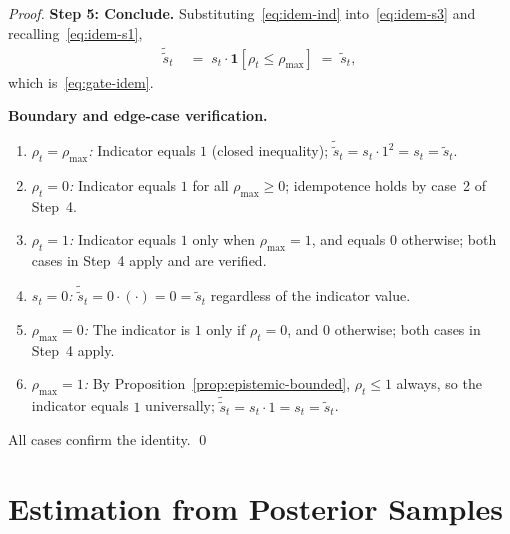 \documentclass[12pt,openany]{book}
\numberwithin{equation}{chapter}
\theoremstyle{plain}
\theoremstyle{definition}
\theoremstyle{remark}
\numberwithin{equation}{chapter}
\theoremstyle{plain}
\begin{document}
\begin{proof}
\medskip
\noindent\textbf{Step 5: Conclude.}
Substituting~\eqref{eq:idem-ind} into~\eqref{eq:idem-s3} and
recalling~\eqref{eq:idem-s1},
\begin{align}
  \tilde{\tilde{s}}_t
  &\;=\; s_t \cdot \mathbf{1}[\rho_t \leq \rho_{\max}]
  \;=\; \tilde{s}_t,
  \label{eq:idem-final}
\end{align}
which is~\eqref{eq:gate-idem}.

\medskip
\noindent\textbf{Boundary and edge-case verification.}
\begin{enumerate}
  \item \emph{$\rho_t = \rho_{\max}$:}
        Indicator equals $1$ (closed inequality);
        $\tilde{\tilde{s}}_t = s_t \cdot 1^{2} = s_t = \tilde{s}_t$.
  \item \emph{$\rho_t = 0$:}
        Indicator equals $1$ for all $\rho_{\max} \geq 0$;
        idempotence holds by case~2 of Step~4.
  \item \emph{$\rho_t = 1$:}
        Indicator equals $1$ only when $\rho_{\max} = 1$, and
        equals $0$ otherwise; both cases in Step~4 apply
        and are verified.
  \item \emph{$s_t = 0$:}
        $\tilde{\tilde{s}}_t = 0 \cdot (\cdot) = 0 = \tilde{s}_t$
        regardless of the indicator value.
  \item \emph{$\rho_{\max} = 0$:}
        The indicator is $1$ only if $\rho_t = 0$, and $0$
        otherwise; both cases in Step~4 apply.
  \item \emph{$\rho_{\max} = 1$:}
        By Proposition~\ref{prop:epistemic-bounded}, $\rho_t \leq 1$
        always, so the indicator equals $1$ universally;
        $\tilde{\tilde{s}}_t = s_t \cdot 1 = s_t = \tilde{s}_t$.
\end{enumerate}
All cases confirm the identity.
\qed
\end{proof}

\section{Estimation from Posterior Samples}
\end{document}
